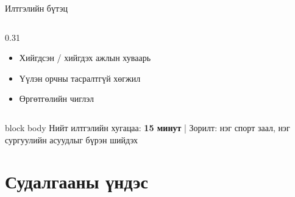 \documentclass[14pt,aspectratio=169]{beamer}
\begin{document}
\begin{frame}{Илтгэлийн бүтэц}
\begin{columns}[T]
\begin{column}{0.31\textwidth}
\begin{itemize}
        \item Хийгдсэн / хийгдэх ажлын хуваарь
        \item Үүлэн орчны тасралтгүй хөгжил
        \item Өргөтгөлийн чиглэл
      \end{itemize}
    \end{column}
  \end{columns}
  \vspace{8pt}
  \begin{beamercolorbox}[sep=4pt,center,rounded=true]{block body}
    \small Нийт илтгэлийн хугацаа: \textbf{15 минут} \quad|\quad
    Зорилт: нэг спорт заал, нэг сургуулийн асуудлыг бүрэн шийдэх
  \end{beamercolorbox}
\end{frame}

\section{Судалгааны үндэс}
\end{document}
